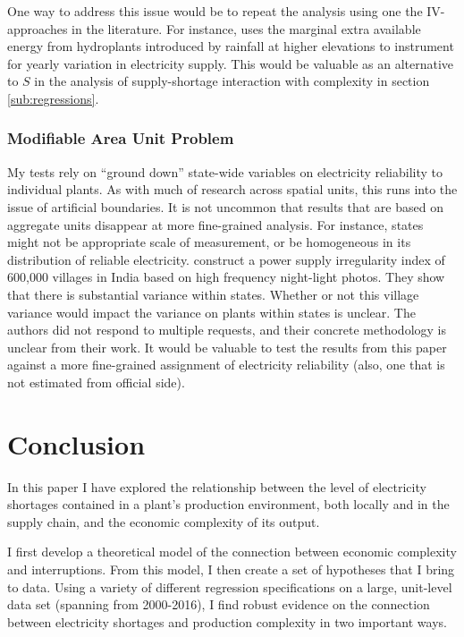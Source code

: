 \documentclass[11pt]{article}
\begin{document}
One way to address this issue would be to repeat the analysis using one the IV-approaches in the literature. For instance, \cite{allcott_how_2016} uses the marginal extra available energy from hydroplants introduced by rainfall at higher elevations to instrument for yearly variation in electricity supply. This would be valuable as an alternative to $S$ in the analysis of supply-shortage interaction with complexity in section \ref{sub:regressions}.

\subsubsection{Modifiable Area Unit Problem}
\label{sec:org4e3cc26}
My tests rely on ``ground down'' state-wide variables on electricity reliability to individual plants. As with much of research across spatial units, this runs into the issue of artificial boundaries. It is not uncommon that results that are based on aggregate units disappear at more fine-grained analysis. For instance, states might not be appropriate scale of measurement, or be homogeneous in its distribution of reliable electricity. \cite{min_whose_2017-2} construct a power supply irregularity index of 600,000 villages in India based on high frequency night-light photos. They show that there is substantial variance within states. Whether or not this village variance would impact the variance on plants within states is unclear. The authors did not respond to multiple requests, and their concrete methodology is unclear from their work. It would be valuable to test the results from this paper against a more fine-grained assignment of electricity reliability (also, one that is not estimated from official side).


\newpage

\section{Conclusion}%
\label{sec:conclusion}

In this paper I have explored the relationship between the level of electricity shortages contained in a plant's production environment, both locally and in the supply chain, and the economic complexity of its output.

I first develop a theoretical model of the connection between economic complexity and interruptions. From this model, I then create a set of hypotheses that I bring to data. Using a variety of different regression specifications on a large, unit-level data set (spanning from 2000-2016), I find robust evidence on the connection between electricity shortages and production complexity in two important ways.
\end{document}
